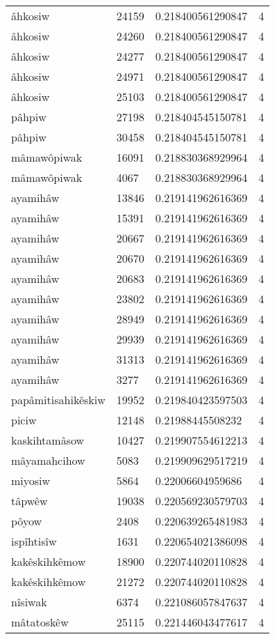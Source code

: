 \begin{longtable}{llll}
âhkosiw & 24159 & 0.218400561290847 & 4 \\
âhkosiw & 24260 & 0.218400561290847 & 4 \\
âhkosiw & 24277 & 0.218400561290847 & 4 \\
âhkosiw & 24971 & 0.218400561290847 & 4 \\
âhkosiw & 25103 & 0.218400561290847 & 4 \\
pâhpiw & 27198 & 0.218404545150781 & 4 \\
pâhpiw & 30458 & 0.218404545150781 & 4 \\
mâmawôpiwak & 16091 & 0.218830368929964 & 4 \\
mâmawôpiwak & 4067 & 0.218830368929964 & 4 \\
ayamihâw & 13846 & 0.219141962616369 & 4 \\
ayamihâw & 15391 & 0.219141962616369 & 4 \\
ayamihâw & 20667 & 0.219141962616369 & 4 \\
ayamihâw & 20670 & 0.219141962616369 & 4 \\
ayamihâw & 20683 & 0.219141962616369 & 4 \\
ayamihâw & 23802 & 0.219141962616369 & 4 \\
ayamihâw & 28949 & 0.219141962616369 & 4 \\
ayamihâw & 29939 & 0.219141962616369 & 4 \\
ayamihâw & 31313 & 0.219141962616369 & 4 \\
ayamihâw & 3277 & 0.219141962616369 & 4 \\
papâmitisahikêskiw & 19952 & 0.219840423597503 & 4 \\
piciw & 12148 & 0.21988445508232 & 4 \\
kaskihtamâsow & 10427 & 0.219907554612213 & 4 \\
mâyamahcihow & 5083 & 0.219909629517219 & 4 \\
miyosiw & 5864 & 0.22006604959686 & 4 \\
tâpwêw & 19038 & 0.220569230579703 & 4 \\
pôyow & 2408 & 0.220639265481983 & 4 \\
ispîhtisîw & 1631 & 0.220654021386098 & 4 \\
kakêskihkêmow & 18900 & 0.220744020110828 & 4 \\
kakêskihkêmow & 21272 & 0.220744020110828 & 4 \\
nîsiwak & 6374 & 0.221086057847637 & 4 \\
mâtatoskêw & 25115 & 0.221446043477617 & 4 \\

\end{longtable}
